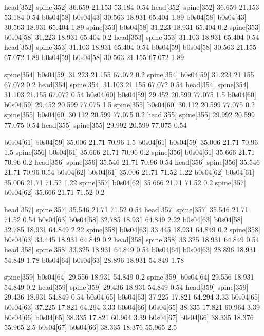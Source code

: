 head[352]    spine[352]    36.659    21.153    53.184    0.54
head[352]    spine[352]    36.659    21.153    53.184    0.54
b0s04[58]    b0s04[43]    30.563    18.931    65.404    1.89
b0s04[58]    b0s04[43]    30.563    18.931    65.404    1.89
spine[353]    b0s04[58]    31.223    18.931    65.404    0.2
spine[353]    b0s04[58]    31.223    18.931    65.404    0.2
head[353]    spine[353]    31.103    18.931    65.404    0.54
head[353]    spine[353]    31.103    18.931    65.404    0.54
b0s04[59]    b0s04[58]    30.563    21.155    67.072    1.89
b0s04[59]    b0s04[58]    30.563    21.155    67.072    1.89


spine[354]    b0s04[59]    31.223    21.155    67.072    0.2
spine[354]    b0s04[59]    31.223    21.155    67.072    0.2
head[354]    spine[354]    31.103    21.155    67.072    0.54
head[354]    spine[354]    31.103    21.155    67.072    0.54
b0s04[60]    b0s04[59]    29.452    20.599    77.075    1.5
b0s04[60]    b0s04[59]    29.452    20.599    77.075    1.5
spine[355]    b0s04[60]    30.112    20.599    77.075    0.2
spine[355]    b0s04[60]    30.112    20.599    77.075    0.2
head[355]    spine[355]    29.992    20.599    77.075    0.54
head[355]    spine[355]    29.992    20.599    77.075    0.54


b0s04[61]    b0s04[59]    35.006    21.71    70.96    1.5
b0s04[61]    b0s04[59]    35.006    21.71    70.96    1.5
spine[356]    b0s04[61]    35.666    21.71    70.96    0.2
spine[356]    b0s04[61]    35.666    21.71    70.96    0.2
head[356]    spine[356]    35.546    21.71    70.96    0.54
head[356]    spine[356]    35.546    21.71    70.96    0.54
b0s04[62]    b0s04[61]    35.006    21.71    71.52    1.22
b0s04[62]    b0s04[61]    35.006    21.71    71.52    1.22
spine[357]    b0s04[62]    35.666    21.71    71.52    0.2
spine[357]    b0s04[62]    35.666    21.71    71.52    0.2


head[357]    spine[357]    35.546    21.71    71.52    0.54
head[357]    spine[357]    35.546    21.71    71.52    0.54
b0s04[63]    b0s04[58]    32.785    18.931    64.849    2.22
b0s04[63]    b0s04[58]    32.785    18.931    64.849    2.22
spine[358]    b0s04[63]    33.445    18.931    64.849    0.2
spine[358]    b0s04[63]    33.445    18.931    64.849    0.2
head[358]    spine[358]    33.325    18.931    64.849    0.54
head[358]    spine[358]    33.325    18.931    64.849    0.54
b0s04[64]    b0s04[63]    28.896    18.931    54.849    1.78
b0s04[64]    b0s04[63]    28.896    18.931    54.849    1.78


spine[359]    b0s04[64]    29.556    18.931    54.849    0.2
spine[359]    b0s04[64]    29.556    18.931    54.849    0.2
head[359]    spine[359]    29.436    18.931    54.849    0.54
head[359]    spine[359]    29.436    18.931    54.849    0.54
b0s04[65]    b0s04[63]    37.225    17.821    64.294    3.33
b0s04[65]    b0s04[63]    37.225    17.821    64.294    3.33
b0s04[66]    b0s04[65]    38.335    17.821    60.964    3.39
b0s04[66]    b0s04[65]    38.335    17.821    60.964    3.39
b0s04[67]    b0s04[66]    38.335    18.376    55.965    2.5
b0s04[67]    b0s04[66]    38.335    18.376    55.965    2.5


